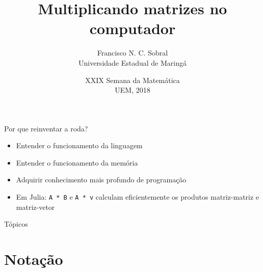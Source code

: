 \documentclass[]{beamer}
\author[Sobral]{Francisco N. C. Sobral\\ Universidade Estadual de Maringá}
\date[XXIX SEMAT]{XXIX Semana da Matemática\\UEM, 2018}
\title[Mat. Mult.]{Multiplicando matrizes no computador}
\newcommand{\code}[1]{\colorbox[gray]{0.8}{\texttt{#1}}}
\begin{document}
\begin{frame}[plain]
\titlepage
\end{frame}

\begin{frame}{Por que reinventar a roda?}

  \begin{itemize}
  \item Entender o funcionamento da linguagem

  \item Entender o funcionamento da memória

  \item Adquirir conhecimento mais profundo de programação

  \item Em Julia: \code{A * B} e \code{A * v} calculam
    eficientemente os produtos matriz-matriz e matriz-vetor
  \end{itemize}

\end{frame}

\begin{frame}{Tópicos}
\tableofcontents
\end{frame}

\section{Notação}
\end{document}
